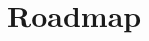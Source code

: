 \documentclass[aspectratio=169, 12pt]{beamer}
\newcommand{\kpi}[1]{\textbf{\color{dhlRed}#1}}
\begin{document}
\section{Roadmap}
\end{document}

